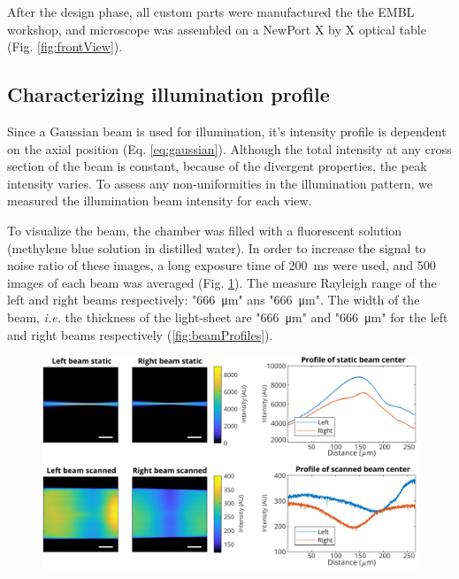   After the design phase, all custom parts were manufactured the the EMBL workshop, and microscope was assembled on a NewPort X by X optical table (Fig. \ref{fig:frontView}).

  \subsection{Characterizing illumination profile}
    Since a Gaussian beam is used for illumination, it's intensity profile is dependent on the axial position (Eq. \ref{eq:gaussian}). Although the total intensity at any cross section of the beam is constant, because of the divergent properties, the peak intensity varies. To assess any non-uniformities in the illumination pattern, we measured the illumination beam intensity for each view.

    To visualize the beam, the chamber was filled with a fluorescent solution (methylene blue solution in distilled water). In order to increase the signal to noise ratio of these images, a long exposure time of \SI{200}{ms} were used, and 500 images of each beam was averaged (Fig. \ref{fig:beamProfiles}). The measure Rayleigh range of the left and right beams respectively: "\SI{666}{\micro m}" ans "\SI{666}{\micro m}". The width of the beam, \textit{i.e.} the thickness of the light-sheet are "\SI{666}{\micro m}" and "\SI{666}{\micro m}" for the left and right beams respectively (\autoref{fig:beamProfiles}).

    \begin{figure}[htb]
      \centering
      \includegraphics[width=\textwidth]{beamProfile488.pdf}
      \label{fig:beamProfiles}
    \end{figure}


